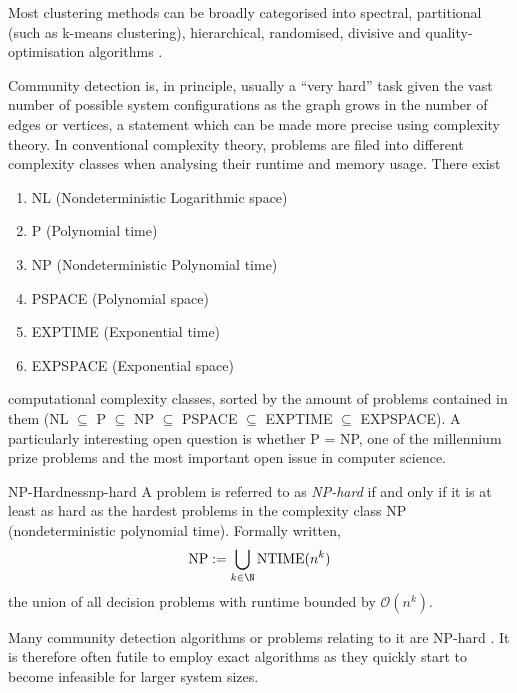 \documentclass{prettytex/ox/mmsc-special-topic}
\begin{document}
  Most clustering methods can be broadly categorised into spectral, partitional (such as k-means clustering), hierarchical, randomised, divisive and quality-optimisation algorithms \parencite{fortunato}.

  Community detection is, in principle, usually a ``very hard'' task given the vast number of possible system configurations as the graph grows in the number of edges or vertices, a statement which can be made more precise using complexity theory.
  In conventional complexity theory, problems are filed into different complexity classes when analysing their runtime and memory usage.
  There exist
  \begin{enumerate}[noitemsep,topsep=0pt,parsep=0pt,partopsep=0pt]
    \item NL (Nondeterministic Logarithmic space)
    \item P (Polynomial time)
    \item NP (Nondeterministic Polynomial time)
    \item PSPACE (Polynomial space)
    \item EXPTIME (Exponential time)
    \item EXPSPACE (Exponential space)
  \end{enumerate}
  computational complexity classes, sorted by the amount of problems contained in them (NL $\subseteq$ P $\subseteq$ NP $\subseteq$ PSPACE $\subseteq$ EXPTIME $\subseteq$ EXPSPACE).
  A particularly interesting open question is whether P = NP, one of the millennium prize problems and the most important open issue in computer science.

  \begin{definition}{NP-Hardness}{np-hard}
    A problem is referred to as \textit{NP-hard} if and only if it is at least as hard as the hardest problems in the complexity class NP (nondeterministic polynomial time). Formally written,
    $$\mathrm{NP} := \bigcup_{k \in \N} \mathrm{NTIME}(n^k)$$
    the union of all decision problems with runtime bounded by $\mathcal{O}(n^k)$.
  \end{definition}

  Many community detection algorithms or problems relating to it are NP-hard \parencite{fortunato}.
  It is therefore often futile to employ exact algorithms as they quickly start to become infeasible for larger system sizes.
\end{document}
